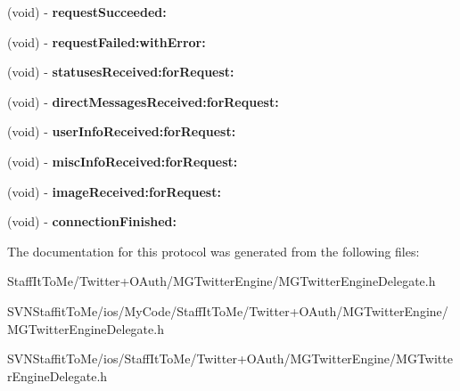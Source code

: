 \begin{DoxyCompactItemize}
\item 
\hypertarget{protocol_m_g_twitter_engine_delegate-p_ae499edf1ac686037c262aca09b61046e}{
(void) -\/ {\bfseries request\-Succeeded\-:}}
\label{protocol_m_g_twitter_engine_delegate-p_ae499edf1ac686037c262aca09b61046e}

\item 
\hypertarget{protocol_m_g_twitter_engine_delegate-p_a20d36760f8a06587326b9954f6d86fa2}{
(void) -\/ {\bfseries request\-Failed\-:with\-Error\-:}}
\label{protocol_m_g_twitter_engine_delegate-p_a20d36760f8a06587326b9954f6d86fa2}

\item 
\hypertarget{protocol_m_g_twitter_engine_delegate-p_abcc40d8212e9b46222b69828a3eac290}{
(void) -\/ {\bfseries statuses\-Received\-:for\-Request\-:}}
\label{protocol_m_g_twitter_engine_delegate-p_abcc40d8212e9b46222b69828a3eac290}

\item 
\hypertarget{protocol_m_g_twitter_engine_delegate-p_aa8f15a5ab438fc797b28bc9fa51f9bf8}{
(void) -\/ {\bfseries direct\-Messages\-Received\-:for\-Request\-:}}
\label{protocol_m_g_twitter_engine_delegate-p_aa8f15a5ab438fc797b28bc9fa51f9bf8}

\item 
\hypertarget{protocol_m_g_twitter_engine_delegate-p_a5a19f97bdf28e581b0f8d87005aac5ab}{
(void) -\/ {\bfseries user\-Info\-Received\-:for\-Request\-:}}
\label{protocol_m_g_twitter_engine_delegate-p_a5a19f97bdf28e581b0f8d87005aac5ab}

\item 
\hypertarget{protocol_m_g_twitter_engine_delegate-p_a5cadd29987cf71c50ce0cad7370edf1b}{
(void) -\/ {\bfseries misc\-Info\-Received\-:for\-Request\-:}}
\label{protocol_m_g_twitter_engine_delegate-p_a5cadd29987cf71c50ce0cad7370edf1b}

\item 
\hypertarget{protocol_m_g_twitter_engine_delegate-p_a02cb45cd9f04e1cbf9a46d1b973dcdc3}{
(void) -\/ {\bfseries image\-Received\-:for\-Request\-:}}
\label{protocol_m_g_twitter_engine_delegate-p_a02cb45cd9f04e1cbf9a46d1b973dcdc3}

\item 
\hypertarget{protocol_m_g_twitter_engine_delegate-p_ad9aa41b99fd8a375d53c7d1ee734fa50}{
(void) -\/ {\bfseries connection\-Finished\-:}}
\label{protocol_m_g_twitter_engine_delegate-p_ad9aa41b99fd8a375d53c7d1ee734fa50}

\end{DoxyCompactItemize}


\-The documentation for this protocol was generated from the following files\-:\begin{DoxyCompactItemize}
\item 
\-Staff\-It\-To\-Me/\-Twitter+\-O\-Auth/\-M\-G\-Twitter\-Engine/\-M\-G\-Twitter\-Engine\-Delegate.\-h\item 
\-S\-V\-N\-Staffit\-To\-Me/ios/\-My\-Code/\-Staff\-It\-To\-Me/\-Twitter+\-O\-Auth/\-M\-G\-Twitter\-Engine/\-M\-G\-Twitter\-Engine\-Delegate.\-h\item 
\-S\-V\-N\-Staffit\-To\-Me/ios/\-Staff\-It\-To\-Me/\-Twitter+\-O\-Auth/\-M\-G\-Twitter\-Engine/\-M\-G\-Twitter\-Engine\-Delegate.\-h\end{DoxyCompactItemize}
